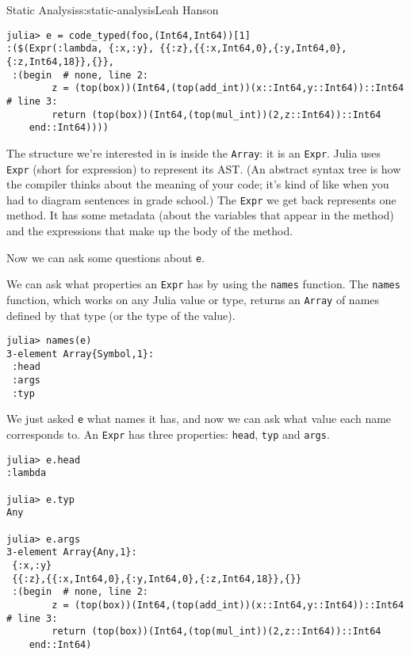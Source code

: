\begin{aosachapter}{Static Analysis}{s:static-analysis}{Leah Hanson}
\begin{verbatim}
julia> e = code_typed(foo,(Int64,Int64))[1]
:($(Expr(:lambda, {:x,:y}, {{:z},{{:x,Int64,0},{:y,Int64,0},{:z,Int64,18}},{}},
 :(begin  # none, line 2:
        z = (top(box))(Int64,(top(add_int))(x::Int64,y::Int64))::Int64 # line 3:
        return (top(box))(Int64,(top(mul_int))(2,z::Int64))::Int64
    end::Int64))))
\end{verbatim}

The structure we're interested in is inside the \texttt{Array}: it is an
\texttt{Expr}. Julia uses \texttt{Expr} (short for expression) to
represent its AST. (An abstract syntax tree is how the compiler thinks
about the meaning of your code; it's kind of like when you had to
diagram sentences in grade school.) The \texttt{Expr} we get back
represents one method. It has some metadata (about the variables that
appear in the method) and the expressions that make up the body of the
method.

Now we can ask some questions about \texttt{e}.

We can ask what properties an \texttt{Expr} has by using the
\texttt{names} function. The \texttt{names} function, which works on any
Julia value or type, returns an \texttt{Array} of names defined by that
type (or the type of the value).

\begin{verbatim}
julia> names(e)
3-element Array{Symbol,1}:
 :head
 :args
 :typ 
\end{verbatim}

We just asked \texttt{e} what names it has, and now we can ask what
value each name corresponds to. An \texttt{Expr} has three properties:
\texttt{head}, \texttt{typ} and \texttt{args}.

\begin{verbatim}
julia> e.head
:lambda

julia> e.typ
Any

julia> e.args
3-element Array{Any,1}:
 {:x,:y}                                                                                                                                                                                     
 {{:z},{{:x,Int64,0},{:y,Int64,0},{:z,Int64,18}},{}}                                                                                                                                         
 :(begin  # none, line 2:
        z = (top(box))(Int64,(top(add_int))(x::Int64,y::Int64))::Int64 # line 3:
        return (top(box))(Int64,(top(mul_int))(2,z::Int64))::Int64
    end::Int64)
\end{verbatim}


\end{aosachapter}

